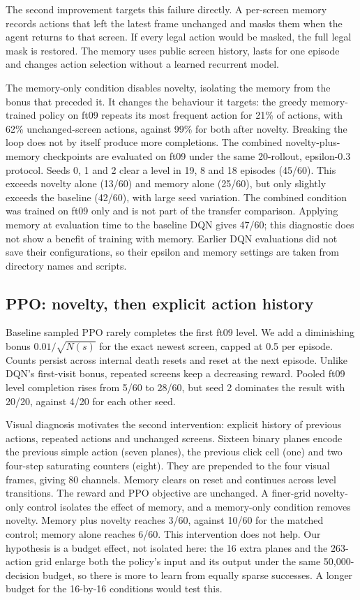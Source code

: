 \documentclass[10pt]{article}
\begin{document}
The second improvement targets this failure directly. A per-screen memory records actions that left the latest frame unchanged and masks them when the agent returns to that screen. If every legal action would be masked, the full legal mask is restored. The memory uses public screen history, lasts for one episode and changes action selection without a learned recurrent model.

The memory-only condition disables novelty, isolating the memory from the bonus that preceded it. It changes the behaviour it targets: the greedy memory-trained policy on ft09 repeats its most frequent action for 21\% of actions, with 62\% unchanged-screen actions, against 99\% for both after novelty. Breaking the loop does not by itself produce more completions. The combined novelty-plus-memory checkpoints are evaluated on ft09 under the same 20-rollout, epsilon-0.3 protocol. Seeds 0, 1 and 2 clear a level in 19, 8 and 18 episodes (45/60). This exceeds novelty alone (13/60) and memory alone (25/60), but only slightly exceeds the baseline (42/60), with large seed variation. The combined condition was trained on ft09 only and is not part of the transfer comparison. Applying memory at evaluation time to the baseline DQN gives 47/60; this diagnostic does not show a benefit of training with memory. Earlier DQN evaluations did not save their configurations, so their epsilon and memory settings are taken from directory names and scripts.

\subsection{PPO: novelty, then explicit action history}
Baseline sampled PPO rarely completes the first ft09 level. We add a diminishing bonus $0.01/\sqrt{N(s)}$ for the exact newest screen, capped at 0.5 per episode. Counts persist across internal death resets and reset at the next episode. Unlike DQN's first-visit bonus, repeated screens keep a decreasing reward. Pooled ft09 level completion rises from 5/60 to 28/60, but seed 2 dominates the result with 20/20, against 4/20 for each other seed.

Visual diagnosis motivates the second intervention: explicit history of previous actions, repeated actions and unchanged screens. Sixteen binary planes encode the previous simple action (seven planes), the previous click cell (one) and two four-step saturating counters (eight). They are prepended to the four visual frames, giving 80 channels. Memory clears on reset and continues across level transitions. The reward and PPO objective are unchanged. A finer-grid novelty-only control isolates the effect of memory, and a memory-only condition removes novelty. Memory plus novelty reaches 3/60, against 10/60 for the matched control; memory alone reaches 6/60. This intervention does not help. Our hypothesis is a budget effect, not isolated here: the 16 extra planes and the 263-action grid enlarge both the policy's input and its output under the same 50,000-decision budget, so there is more to learn from equally sparse successes. A longer budget for the 16-by-16 conditions would test this.
\end{document}
